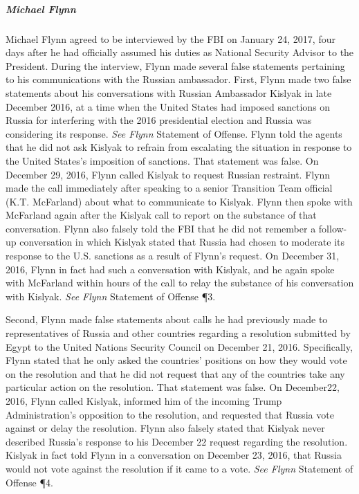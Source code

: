 \subparagraph{Michael Flynn}
Michael Flynn agreed to be interviewed by the FBI on January 24, 2017, four days after he had officially assumed his duties as National Security Advisor to the President.
During the interview, Flynn made several false statements pertaining to his communications with the Russian ambassador.
First, Flynn made two false statements about his conversations with Russian Ambassador Kislyak in late December 2016, at a time when the United States had imposed sanctions on Russia for interfering with the 2016 presidential election and Russia was considering its response.
\textit{See Flynn} Statement of Offense.
Flynn told the agents that he did not ask Kislyak to refrain from escalating the situation in response to the United States's imposition of sanctions.
That statement was false.
On December 29, 2016, Flynn called Kislyak to request Russian restraint.
Flynn made the call immediately after speaking to a senior Transition Team official (K.T. McFarland) about what to communicate to Kislyak.
Flynn then spoke with McFarland again after the Kislyak call to report on the substance of that conversation.
Flynn also falsely told the FBI that he did not remember a follow-up conversation in which Kislyak stated that Russia had chosen to moderate its response to the U.S. sanctions as a result of Flynn's request.
On December 31, 2016, Flynn in fact had such a conversation with Kislyak, and he again spoke with McFarland within hours of the call to relay the substance of his conversation with Kislyak.
\textit{See Flynn} Statement of Offense \P 3.

Second, Flynn made false statements about calls he had previously made to representatives of Russia and other countries regarding a resolution submitted by Egypt to the United Nations Security Council on December 21, 2016.
Specifically, Flynn stated that he only asked the countries' positions on how they would vote on the resolution and that he did not request that any of the countries take any particular action on the resolution.
That statement was false.
On December22, 2016, Flynn called Kislyak, informed him of the incoming Trump Administration's opposition to the resolution, and requested that Russia vote against or delay the resolution.
Flynn also falsely stated that Kislyak never described Russia's response to his December 22 request regarding the resolution.
Kislyak in fact told Flynn in a conversation on December 23, 2016, that Russia would not vote against the resolution if it came to a vote.
\textit{See Flynn} Statement of Offense \P 4.

